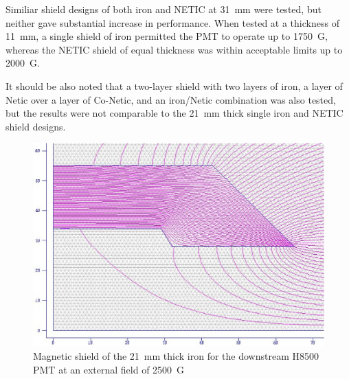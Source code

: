 \documentclass[12pt]{article}
\begin{document}
Similiar shield designs of both iron and
NETIC at 31~mm were tested, but neither gave substantial increase in 
performance. When tested at a thickness of 11~mm, a single shield of iron
permitted the PMT to operate up to 1750~G, whereas the NETIC shield of
equal thickness was within acceptable limits up to 2000~G.

 It should be also  noted that a two-layer shield with
two layers of iron, a layer of Netic over a layer of Co-Netic, and 
an iron/Netic combination was also tested, but the results were not 
comparable to the 21~mm thick single iron and NETIC shield designs.


\begin{figure}[htbp]
\centering
\includegraphics[width=1\textwidth]{Iron_21mm_Shield.eps}
\caption{\small{Magnetic shield  of the 21~mm thick iron  for the downstream
H8500 PMT at an external field of 2500~G}}
\label{Single_Iron_21mm_Shield}
\end{figure}

\newpage
\clearpage
\end{document}
